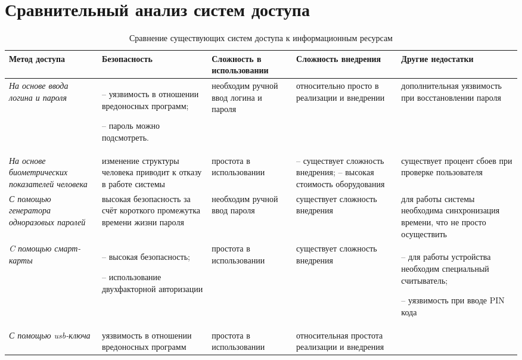 \section{Сравнительный анализ систем доступа}

\begin{table}[pH]
  \centering
  \small
  \begin{tabular}{|p{2.5cm}|p{3.5cm}|p{2.5cm}|p{2.75cm}|p{3.25cm}|}
    \hline
    
	\textbf{Метод доступа} & \textbf{Безопасность} & \textbf{Сложность в
	использовании} & \textbf{Сложность внедрения} & \textbf{Другие недостатки} \\
	\hline
	
\textit{На основе ввода логина и пароля} & -- уязвимость в отношении вредоносных
программ; 

-- пароль можно подсмотреть. & необходим ручной ввод логина и пароля
& относительно просто в реализации и внедрении & дополнительная уязвимость при
восстановлении пароля  \\ \hline

\textit{На основе биометрических показателей человека} & изменение структуры
человека приводит к отказу в работе системы & простота в использовании & --
существует сложность внедрения; -- высокая стоимость оборудования & существует процент
  сбоев при проверке пользователя \\ \hline
  
\textit{С помощью генератора одноразовых паролей} & высокая безопасность за счёт
 короткого промежутка времени жизни пароля & необходим ручной ввод пароля &
 существует сложность внедрения & для работы системы необходима синхронизация
 времени, что не просто осуществить\\ \hline
  
 \textit{C помощью смарт-карты} & -- высокая безопасность;
 
-- использование двухфакторной авторизации & простота в использовании &
существует сложность внедрения & -- для работы устройства необходим специальный
считыватель;

-- уязвимость при вводе PIN кода \\ \hline
  
  \textit{С помощью usb-ключа} & уязвимость в отношении вредоносных программ &
  простота в использовании & относительная простота  реализации и внедрения & \\
  \hline
  \end{tabular}
  \caption{Сравнение существующих систем доступа к информационным ресурсам}
  \label{tab:3}
\end{table}

